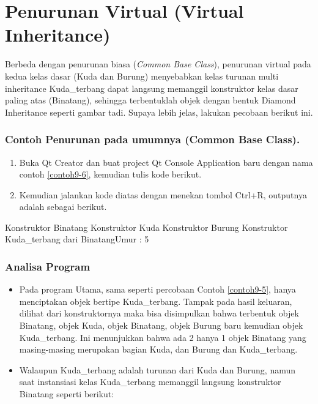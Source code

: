 \section{Penurunan Virtual (Virtual
Inheritance)}\label{penurunan-virtual-virtual-inheritance}

Berbeda dengan penurunan biasa (\emph{Common Base Class}), penurunan
virtual pada kedua kelas dasar (Kuda dan Burung) menyebabkan kelas
turunan multi inheritance Kuda\_terbang dapat langsung memanggil
konstruktor kelas dasar paling atas (Binatang), sehingga terbentuklah
objek dengan bentuk Diamond Inheritance seperti gambar tadi. Supaya
lebih jelas, lakukan pecobaan berikut ini.

\subsubsection*{Contoh Penurunan pada umumnya (Common Base Class).}

\begin{enumerate}

\item
 Buka Qt Creator dan buat project Qt Console Application baru dengan
 nama contoh \ref{contoh9-6}, kemudian tulis kode berikut.




\item
 Kemudian jalankan kode diatas dengan menekan tombol Ctrl+R, outputnya
 adalah sebagai berikut.
\end{enumerate}
\begin{lcverbatim}
Konstruktor Binatang
Konstruktor Kuda
Konstruktor Burung
Konstruktor Kuda_terbang dari
BinatangUmur : 5
\end{lcverbatim}


\subsubsection*{Analisa Program}

\begin{itemize}
\item
 Pada program Utama, sama seperti percobaan Contoh \ref{contoh9-5}, hanya menciptakan
 objek bertipe Kuda\_terbang. Tampak pada hasil keluaran, dilihat dari
 konstruktornya maka bisa disimpulkan bahwa terbentuk objek Binatang,
 objek Kuda, objek Binatang, objek Burung baru kemudian objek
 Kuda\_terbang. Ini menunjukkan bahwa ada 2 hanya 1 objek Binatang yang
 masing-masing merupakan bagian Kuda, dan Burung dan Kuda\_terbang.
\item
 Walaupun Kuda\_terbang adalah turunan dari Kuda dan Burung, namun saat
 instansiasi kelas Kuda\_terbang memanggil langsung konstruktor
 Binatang seperti berikut:


\end{itemize}

